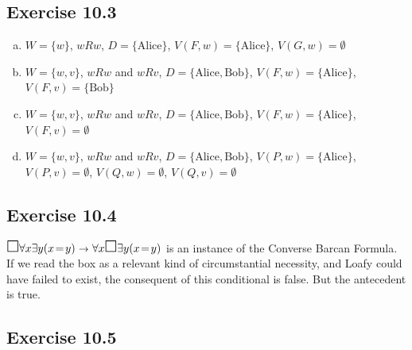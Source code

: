 \documentclass{scrartcl}
\let\oldbox\Box
\renewcommand\Box{\scaleobj{1.2}{\oldbox}}
\let\oldto\to
\renewcommand\to{\scaleobj{0.95}{\,\oldto\,}}
\begin{document}
  \subsection*{Exercise 10.3}

%
%
  \begin{enumerate}[(a)]
  \item $W=\{ w \}$, $wRw$, $D = \{ \text{Alice} \}$, $V(F,w) = \{ \text{Alice} \}$, $V(G,w) = \emptyset$
  \item $W=\{ w,v \}$, $wRw$ and $wRv$, $D = \{ \text{Alice}, \text{Bob} \}$, $V(F,w) = \{ \text{Alice} \}$, $V(F,v) = \{ \text{Bob} \}$
  \item $W=\{ w,v \}$, $wRw$ and $wRv$, $D = \{ \text{Alice}, \text{Bob} \}$, $V(F,w) = \{ \text{Alice} \}$, $V(F,v) = \emptyset$
  \item $W=\{ w,v \}$, $wRw$ and $wRv$, $D = \{ \text{Alice}, \text{Bob} \}$, $V(P,w) = \{ \text{Alice} \}$, $V(P,v) = \emptyset$, $V(Q,w) = \emptyset$, $V(Q,v) = \emptyset$
  \end{enumerate}

  \subsection*{Exercise 10.4}

%
%
  $\Box \forall x \exists y(x\!=\!y) \to \forall x \Box\exists y(x\!=\!y)$ is an
  instance of the Converse Barcan Formula. If we read the box as a relevant kind
  of circumstantial necessity, and Loafy could have failed to exist, the
  consequent of this conditional is false. But the antecedent is true.

  \subsection*{Exercise 10.5}
\end{document}
